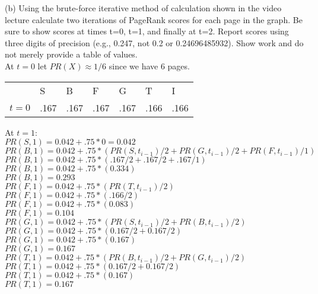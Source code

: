 \documentclass{article}
\begin{document}
\noindent
(b) Using the brute-force iterative method of calculation shown in the video lecture calculate two
iterations of PageRank scores for each page in the graph. Be sure to show scores at times t=0, t=1, and finally
at t=2. Report scores using three digits of precision (e.g., 0.247, not 0.2 or 0.24696485932). Show work and
do not merely provide a table of values. \\


At $t=0$ let $PR(X) \approx 1/6$ since we have 6 pages. 
\begin{table}[h!]
	\begin{tabular}{lllllll}
		      & S    & B    & F    & G    & T    & I    \\
		$t=0$ & .167 & .167 & .167 & .167 & .166 & .166  
	\end{tabular}
\end{table}

\noindent
At $t=1$: \\
$PR(S, 1) = 0.042 + .75*0 = 0.042$\\

\noindent
$PR(B, 1) = 0.042 + .75*(PR(S,t_{i-1})/2 + PR(G,t_{i-1})/2 + PR(F, t_{i-1})/1)$ \\
$PR(B, 1) = 0.042 + .75*(.167/2 + .167/2 + .167/1)$ \\
$PR(B, 1) = 0.042 + .75*(0.334)$ \\
$PR(B, 1) = 0.293$ \\

\noindent
$PR(F, 1) = 0.042 + .75*(PR(T,t_{i-1})/2)$ \\
$PR(F, 1) = 0.042 + .75*(.166/2)$ \\
$PR(F, 1) = 0.042 + .75*(0.083)$ \\
$PR(F, 1) = 0.104$ \\

\noindent
$PR(G, 1) = 0.042 + .75*(PR(S,t_{i-1})/2 + PR(B,t_{i-1})/2)$ \\
$PR(G, 1) = 0.042 + .75*(0.167/2 + 0.167/2)$ \\
$PR(G, 1) = 0.042 + .75*(0.167)$ \\
$PR(G, 1) = 0.167$ \\

\noindent
$PR(T, 1) = 0.042 + .75*(PR(B,t_{i-1})/2 + PR(G,t_{i-1})/2)$ \\
$PR(T, 1) = 0.042 + .75*(0.167/2 + 0.167/2)$ \\
$PR(T, 1) = 0.042 + .75*(0.167)$ \\
$PR(T, 1) = 0.167$ \\
\end{document}
